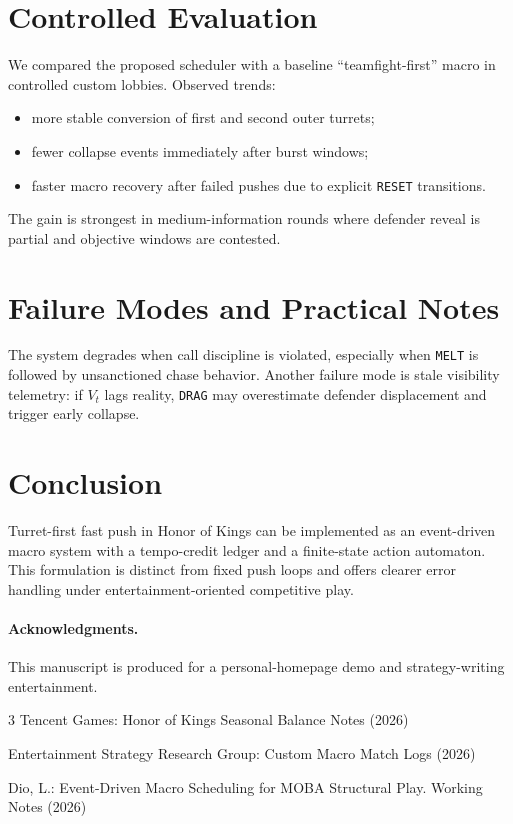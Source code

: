 \documentclass[runningheads]{llncs}
\begin{document}
\section{Controlled Evaluation}
We compared the proposed scheduler with a baseline ``teamfight-first'' macro in controlled custom lobbies.
Observed trends:
\begin{itemize}
\item more stable conversion of first and second outer turrets;
\item fewer collapse events immediately after burst windows;
\item faster macro recovery after failed pushes due to explicit \texttt{RESET} transitions.
\end{itemize}
The gain is strongest in medium-information rounds where defender reveal is partial and objective windows are contested.

\section{Failure Modes and Practical Notes}
The system degrades when call discipline is violated, especially when \texttt{MELT} is followed by unsanctioned chase behavior. Another failure mode is stale visibility telemetry: if $V_t$ lags reality, \texttt{DRAG} may overestimate defender displacement and trigger early collapse.

\section{Conclusion}
Turret-first fast push in Honor of Kings can be implemented as an event-driven macro system with a tempo-credit ledger and a finite-state action automaton. This formulation is distinct from fixed push loops and offers clearer error handling under entertainment-oriented competitive play.

\paragraph{Acknowledgments.}
This manuscript is produced for a personal-homepage demo and strategy-writing entertainment.

\begin{thebibliography}{3}
Tencent Games: Honor of Kings Seasonal Balance Notes (2026)

Entertainment Strategy Research Group: Custom Macro Match Logs (2026)

Dio, L.: Event-Driven Macro Scheduling for MOBA Structural Play. Working Notes (2026)
\end{thebibliography}
\end{document}
